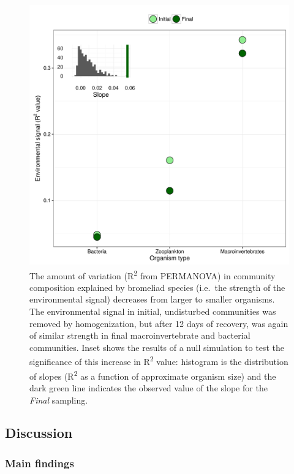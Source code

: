 \begin{figure}[htbp]
\centering
\includegraphics{figures/r2_plot.pdf}
\caption{The amount of variation (R\textsuperscript{2} from PERMANOVA)
in community composition explained by bromeliad species (i.e.~the
strength of the environmental signal) decreases from larger to smaller
organisms. The environmental signal in initial, undisturbed communities
was removed by homogenization, but after 12 days of recovery, was again
of similar strength in final macroinvertebrate and bacterial
communities. Inset shows the results of a null simulation to test the
significance of this increase in R\textsuperscript{2} value: histogram
is the distribution of slopes (R\textsuperscript{2} as a function of
approximate organism size) and the dark green line indicates the
observed value of the slope for the \emph{Final} sampling.}
\end{figure}

\subsection{Discussion}\label{discussion}

\subsubsection{Main findings}\label{main-findings}

